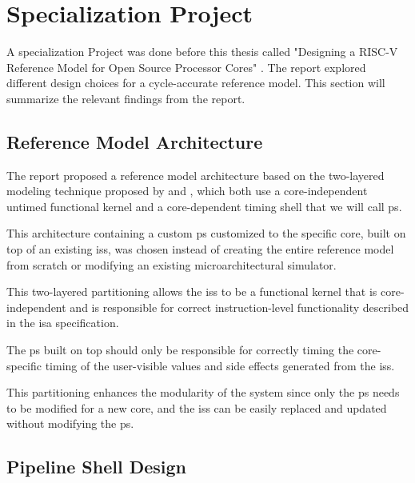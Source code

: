 \chapter{Specialization Project}
\label{ch:specialization}
\label{sec:specialization}

A specialization Project was done before this thesis called "Designing a RISC-V Reference Model for Open Source Processor Cores" \cite{torjenygaardeikenesDesigningRISCVReference2023}. The report explored different design choices for a cycle-accurate reference model. This section will summarize the relevant findings from the report.




\section{Reference Model Architecture}
\label{sec:pw_architecture}

The report proposed a reference model architecture based on the two-layered modeling technique proposed by \textcite{chiangEfficientTwolayeredCycleaccurate2009} and \textcite{leeFaCSimFastCycleAccurate2008}, which both use a core-independent untimed functional kernel and a core-dependent timing shell that we will call \gls{ps}.

This architecture containing a custom \gls{ps} customized to the specific core, built on top of an existing \acrshort{iss}, was chosen instead of creating the entire reference model from scratch or modifying an existing microarchitectural simulator. 

This two-layered partitioning allows the \acrshort{iss} to be a functional kernel that is core-independent and is responsible for correct instruction-level functionality described in the \acrshort{isa} specification. 

The \gls{ps} built on top should only be responsible for correctly timing the core-specific timing of the user-visible values and side effects generated from the \acrshort{iss}. 

This partitioning enhances the modularity of the system since only the \gls{ps} needs to be modified for a new core, and the \acrshort{iss} can be easily replaced and updated without modifying the \gls{ps}. 


\section{Pipeline Shell Design}
\label{sec:pw_pipelineShellDesign}

